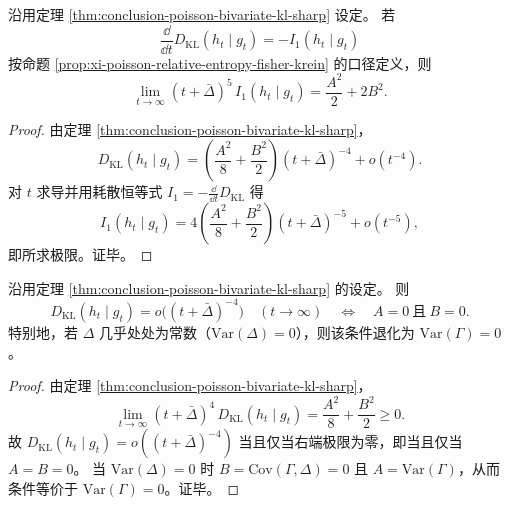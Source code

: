 \begin{theorem}\label{thm:conclusion-poisson-bivariate-fisher-sharp}
沿用定理 \ref{thm:conclusion-poisson-bivariate-kl-sharp} 设定。
若
\[
\frac{\dd}{\dd t}D_{\mathrm{KL}}(h_t\mid g_t)=-I_1(h_t\mid g_t)
\]
按命题 \ref{prop:xi-poisson-relative-entropy-fisher-krein} 的口径定义，则
\[
\lim_{t\to\infty}(t+\bar\Delta)^5\,I_1(h_t\mid g_t)
=\frac{A^2}{2}+2B^2.
\]
\end{theorem}
\begin{proof}
由定理 \ref{thm:conclusion-poisson-bivariate-kl-sharp}，
\[
D_{\mathrm{KL}}(h_t\mid g_t)
=\left(\frac{A^2}{8}+\frac{B^2}{2}\right)(t+\bar\Delta)^{-4}+o(t^{-4}).
\]
对 \(t\) 求导并用耗散恒等式
\(
I_1=-\frac{\dd}{\dd t}D_{\mathrm{KL}}
\)
得
\[
I_1(h_t\mid g_t)
=4\left(\frac{A^2}{8}+\frac{B^2}{2}\right)(t+\bar\Delta)^{-5}+o(t^{-5}),
\]
即所求极限。证毕。
\end{proof}

\begin{corollary}[四阶标度消失的充要条件]\label{cor:conclusion-poisson-bivariate-fourth-order-vanishing}
沿用定理 \ref{thm:conclusion-poisson-bivariate-kl-sharp} 的设定。
则
\[
D_{\mathrm{KL}}(h_t\mid g_t)=o\bigl((t+\bar\Delta)^{-4}\bigr)\quad(t\to\infty)
\quad\Longleftrightarrow\quad
A=0\ \text{且}\ B=0.
\]
特别地，若 \(\Delta\) 几乎处处为常数（\(\mathrm{Var}(\Delta)=0\)），则该条件退化为 \(\mathrm{Var}(\Gamma)=0\)。
\end{corollary}
\begin{proof}
由定理 \ref{thm:conclusion-poisson-bivariate-kl-sharp}，
\[
\lim_{t\to\infty}(t+\bar\Delta)^4\,D_{\mathrm{KL}}(h_t\mid g_t)=\frac{A^2}{8}+\frac{B^2}{2}\ge 0.
\]
故 \(D_{\mathrm{KL}}(h_t\mid g_t)=o((t+\bar\Delta)^{-4})\) 当且仅当右端极限为零，即当且仅当 \(A=B=0\)。
当 \(\mathrm{Var}(\Delta)=0\) 时 \(B=\mathrm{Cov}(\Gamma,\Delta)=0\) 且 \(A=\mathrm{Var}(\Gamma)\)，从而条件等价于 \(\mathrm{Var}(\Gamma)=0\)。证毕。
\end{proof}

